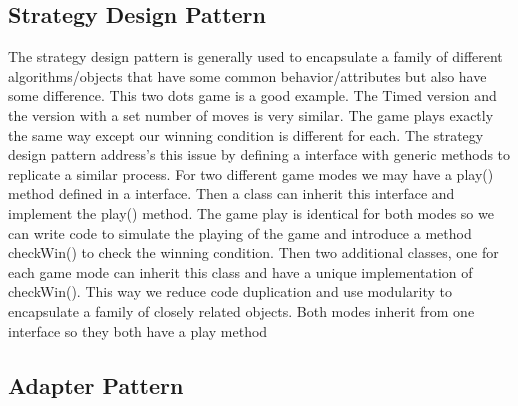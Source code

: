 \documentclass[12pt]{article}
\begin{document}
\begin{enumerate}
\subsection*{Strategy Design Pattern}
\noindent The strategy design pattern is generally used to encapsulate a family of different algorithms/objects that have some common behavior/attributes but also have some difference. This two dots game is a good example. The Timed version and the version with a set number of moves is very similar. The game plays exactly the same way except our winning condition is different for each. The strategy design pattern address's this issue by defining a interface with generic methods to replicate a similar process. For two different game modes we may have a play() method defined in a interface. Then a class can inherit this interface and implement the play() method. The game play is identical for both modes so we can write code to simulate the playing of the game and introduce a method checkWin() to check the winning condition. Then two additional classes, one for each game mode can inherit this class and have a unique implementation of checkWin(). This way we reduce code duplication and use modularity to encapsulate a family of closely related objects. Both modes inherit from one interface so they both have a play method

\subsection*{Adapter Pattern}


\end{enumerate}
\end{document}

